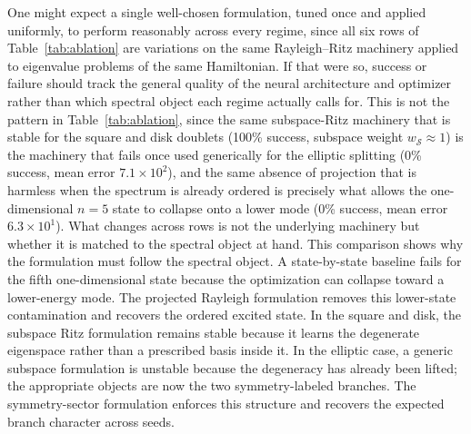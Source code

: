 \documentclass[10pt,onecolumn]{article}
\begin{document}
One might expect a single well-chosen formulation, tuned once and applied uniformly, to perform reasonably across every regime, since all six rows of Table~\ref{tab:ablation} are variations on the same Rayleigh--Ritz machinery applied to eigenvalue problems of the same Hamiltonian. If that were so, success or failure should track the general quality of the neural architecture and optimizer rather than which spectral object each regime actually calls for. This is not the pattern in Table~\ref{tab:ablation}, since the same subspace-Ritz machinery that is stable for the square and disk doublets (100\% success, subspace weight $w_{\mathcal{S}}\approx1$) is the machinery that fails once used generically for the elliptic splitting (0\% success, mean error $7.1\times10^{2}$), and the same absence of projection that is harmless when the spectrum is already ordered is precisely what allows the one-dimensional $n=5$ state to collapse onto a lower mode (0\% success, mean error $6.3\times10^{1}$). What changes across rows is not the underlying machinery but whether it is matched to the spectral object at hand. This comparison shows why the formulation must follow the spectral object. A state-by-state baseline fails for the fifth one-dimensional state because the optimization can collapse toward a lower-energy mode. The projected Rayleigh formulation removes this lower-state contamination and recovers the ordered excited state. In the square and disk, the subspace Ritz formulation remains stable because it learns the degenerate eigenspace rather than a prescribed basis inside it. In the elliptic case, a generic subspace formulation is unstable because the degeneracy has already been lifted; the appropriate objects are now the two symmetry-labeled branches. The symmetry-sector formulation enforces this structure and recovers the expected branch character across seeds.
\end{document}
